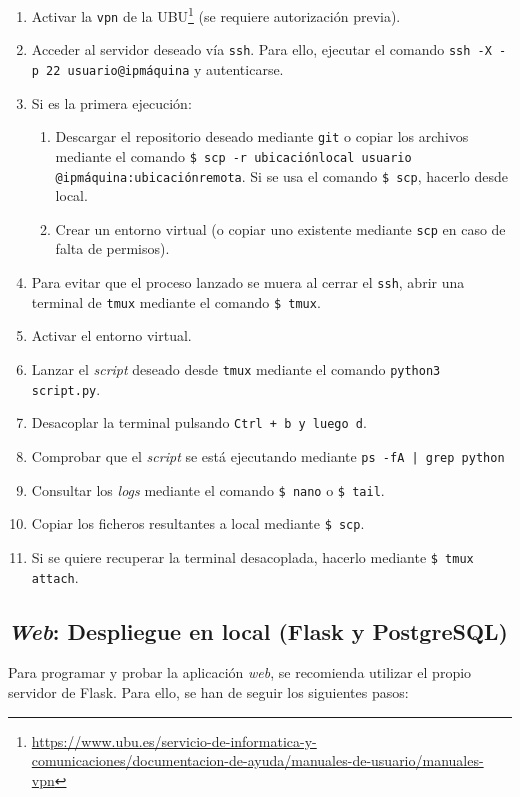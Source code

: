 \begin{enumerate}
	\item Activar la \texttt{vpn} de la UBU\footnote{\url{https://www.ubu.es/servicio-de-informatica-y-comunicaciones/documentacion-de-ayuda/manuales-de-usuario/manuales-vpn}} (se requiere autorización previa).
	\item Acceder al servidor deseado vía \texttt{ssh}. Para ello, ejecutar el comando \texttt{ssh -X -p 22 usuario@ipmáquina} y autenticarse.
	\item Si es la primera ejecución:
		\begin{enumerate}
			\item Descargar el repositorio deseado mediante \texttt{git} o copiar los archivos mediante el comando \texttt{\$ scp -r ubicaciónlocal usuario} \texttt{@ipmáquina:ubicaciónremota}. Si se usa el comando \texttt{\$ scp}, hacerlo desde local.
			\item Crear un entorno virtual (o copiar uno existente mediante \texttt{scp} en caso de falta de permisos).
		\end{enumerate}
	\item Para evitar que el proceso lanzado se muera al cerrar el \texttt{ssh}, abrir una terminal de \texttt{tmux} mediante el comando \texttt{\$ tmux}.
	\item Activar el entorno virtual.
	\item Lanzar el \textit{script} deseado desde \texttt{tmux} mediante el comando \texttt{python3 script.py}.
	\item Desacoplar la terminal pulsando \texttt{Ctrl + b y luego d}.
	\item Comprobar que el \textit{script} se está ejecutando mediante \texttt{ps -fA | grep python}
	\item Consultar los \textit{logs} mediante el comando \texttt{\$ nano} o \texttt{\$ tail}.
	\item Copiar los ficheros resultantes a local mediante \texttt{\$ scp}.
	\item Si se quiere recuperar la terminal desacoplada, hacerlo mediante \texttt{\$ tmux attach}.
\end{enumerate}

\subsection{\textit{Web}: Despliegue en local (Flask y PostgreSQL)}
\label{s-d:flask-deploy}
Para programar y probar la aplicación \textit{web}, se recomienda utilizar el propio servidor de Flask. Para ello, se han de seguir los siguientes pasos:

